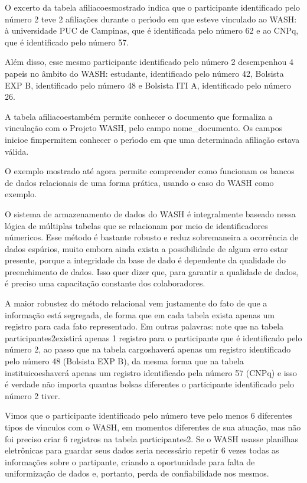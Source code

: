 \documentclass[
12pt,		%
openright,	%
twoside,  %
a4paper,			%
chapter=TITLE,		%
english,			%
french,				%
spanish,			%
brazil				%
]{USPSC-classe/USPSC}
\begin{document}
O excerto da tabela \textquotedbl afiliacoes\textquotedbl  mostrado indica que o participante identificado pelo n\'umero 2 teve 2 afilia\c{c}\~oes durante o per\'{\i}odo em que esteve vinculado ao WASH: \`a universidade PUC de Campinas, que \'e identificada pelo n\'umero 62 e ao CNPq, que \'e identificado pelo n\'umero 57.


Al\'em disso, esse mesmo participante identificado pelo n\'umero 2 desempenhou 4 papeis no \^ambito do WASH: estudante, identificado pelo n\'umero 42, Bolsista EXP B, identificado pelo n\'umero 48 e Bolsista ITI A, identificado pelo n\'umero 26.


A tabela \textquotedbl afiliacoes\textquotedbl  tamb\'em permite conhecer o documento que formaliza a vincula\c{c}\~ao com o Projeto WASH, pelo campo nome\_documento. Os campos \textquotedbl inicio\textquotedbl  e \textquotedbl fim\textquotedbl  permitem conhecer o per\'{\i}odo em que uma determinada afilia\c{c}\~ao estava v\'alida.


O exemplo mostrado at\'e agora permite compreender como funcionam os bancos de dados relacionais de uma forma pr\'atica, usando o caso do WASH como exemplo.


O sistema de armazenamento de dados do WASH \'e integralmente baseado nessa l\'ogica de m\'ultiplas tabelas que se relacionam por meio de identificadores n\'umericos. Esse m\'etodo \'e bastante robusto e reduz sobremaneira a ocorr\^encia de dados esp\'urios, muito embora ainda exista a possibilidade de algum erro estar presente, porque a integridade da base de dado \'e dependente da qualidade do preenchimento de dados. Isso quer dizer que, para garantir a qualidade de dados, \'e preciso uma capacita\c{c}\~ao constante dos colaboradores.


A maior robustez do m\'etodo relacional vem justamente do fato de que a informa\c{c}\~ao est\'a segregada, de forma que em cada tabela exista apenas um registro para cada fato representado. Em outras palavras: note que na tabela \textquotedbl participantes2\textquotedbl  existir\'a apenas 1 registro para o participante que \'e identificado pelo n\'umero 2, ao passo que na tabela \textquotedbl cargos\textquotedbl  haver\'a apenas um registro identificado pelo n\'umero 48 (Bolsista EXP B), da mesma forma que na tabela \textquotedbl instituicoes\textquotedbl  haver\'a apenas um registro identificado pela n\'umero 57 (CNPq) e isso \'e verdade n\~ao importa quantas bolsas diferentes o participante identificado pelo n\'umero 2 tiver.


Vimos que o participante identificado pelo n\'umero \textquotedbl  teve  pelo menos 6 diferentes tipos de v\'{\i}nculos com o WASH, em momentos diferentes de sua atua\c{c}\~ao, mas n\~ao foi preciso criar 6 registros na tabela \textquotedbl participantes2\textquotedbl . Se o WASH usasse planilhas eletr\^onicas para guardar seus dados seria necess\'ario repetir 6 vezes todas as informa\c{c}\~oes sobre o partipante, criando a oportunidade para falta de uniformiza\c{c}\~ao de dados e, portanto, perda de confiabilidade nos mesmos.
\end{document}
